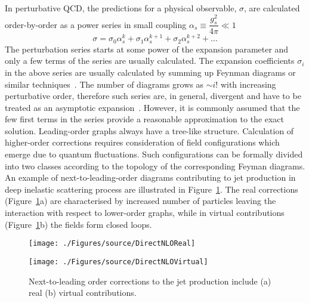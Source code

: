 In perturbative QCD, the predictions for a physical observable, $\sigma$, are calculated order-by-order as a power series in small coupling $\alpha_s \equiv \dfrac{g_s^2}{4\pi} \ll 1$
\begin{equation}
   \sigma=\sigma_{0}\alpha^{k}_s + \sigma_{1}\alpha^{k+1}_s + \sigma_{2}\alpha^{k+2}_s + \ldots
	 \label{eq:pertseries}
\end{equation}
The perturbation series starts at some power of the expansion parameter and only a few terms of the series are usually calculated. The expansion coefficients $\sigma_i$ in the above series are usually calculated by summing up Feynman diagrams or similar techniques~\cite{Henn:2014yza}. The number of diagrams grows as $\sim i!$ with increasing perturbative order, therefore such series are, in general, divergent and have to be treated as an asymptotic expansion~\cite{Ioffe:2010zz}. However, it is commonly assumed that the few first terms in the series provide a reasonable approximation to the exact solution. Leading-order graphs always have a tree-like structure. Calculation of higher-order corrections requires consideration of field configurations which emerge due to quantum fluctuations. Such configurations can be formally divided into two classes according to the topology of the corresponding Feyman diagrams. An example of next-to-leading-order diagrams contributing to jet production in deep inelastic scattering process are illustrated in Figure~\ref{fig:nlojetfeyn}. The real corrections (Figure~\ref{fig:nlojetfeyn}a) are characterised by increased number of particles leaving the interaction with respect to lower-order graphs, while in virtual contributions (Figure~\ref{fig:nlojetfeyn}b) the fields form closed loops.
 
\begin{figure}[h]
	\begin{subfloat}[]{
		\texttt{[image: ./Figures/source/DirectNLOReal]}
		\label{fig:nlojetfeynvirtual}
	 }%
	\end{subfloat}\hfill
	\begin{subfloat}[]{
		\texttt{[image: ./Figures/source/DirectNLOVirtual]}
		\label{fig:nlojetfeynreal}
	}%
	\end{subfloat}
\caption{Next-to-leading order corrections to the jet production include (a) real (b) virtual contributions.}
\label{fig:nlojetfeyn}
\end{figure}

